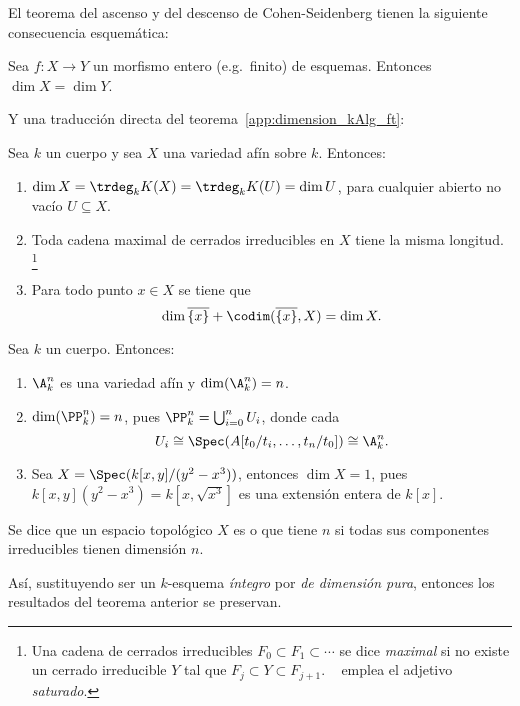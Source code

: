 El teorema del ascenso y del descenso de Cohen-Seidenberg tienen la siguiente consecuencia esquemática:
\begin{cor}
	Sea $f \colon X \to Y$ un morfismo entero (e.g.\ finito) de esquemas.
	Entonces $\dim X = \dim Y$.
\end{cor}

Y una traducción directa del teorema~\ref{app:dimension_kAlg_ft}:
\begin{thm}\label{thm:integral_affine_are_biequidim}
	Sea $k$ un cuerpo y sea $X$ una variedad afín sobre $k$. Entonces:
	\begin{enumerate}
		\item $\dim X = \trdeg_k K(X) = \trdeg_k K(U) = \dim U$, para cualquier abierto no vacío $U \subseteq X$.
		\item Toda cadena maximal de cerrados irreducibles en $X$ tiene la misma longitud.%
			\footnote{Una cadena de cerrados irreducibles $F_0 \subset F_1 \subset \cdots$ se dice \textit{maximal} si no existe un cerrado irreducible
				$Y$ tal que $F_j \subset Y \subset F_{j+1}$. \citeauthor{ega-iv1}~\cite{ega-iv1} emplea el adjetivo \textit{saturado}.}
		\item Para todo punto $x \in X$ se tiene que
			$$ \dim\overline{\{ x \}} + \codim(\overline{\{ x \}}, X) = \dim X. $$
	\end{enumerate}
\end{thm}

\begin{ex}
	Sea $k$ un cuerpo. Entonces:
	\begin{enumerate}
		\item $\A^n_k$ es una variedad afín y $\dim(\A^n_k) = n$.
		\item $\dim(\PP^n_k) = n$, pues $\PP^n_k = \bigcup_{i=0}^{n} U_i$, donde cada
			\[
				U_i \cong \Spec(A[t_0/t_i, \dots, t_n/t_0]) \cong \A^n_k.
			\]
		\item Sea $X = \Spec( k[x, y]/(y^2 - x^3) )$, entonces $\dim X = 1$,
			pues $k[x, y](y^2 - x^3) = k[x, \sqrt{x^3}]$ es una extensión entera de $k[x]$.
	\end{enumerate}
\end{ex}

\begin{mydef}
	Se dice que un espacio topológico $X$ es  o que tiene
	 $n$ si todas sus componentes irreducibles tienen dimensión $n$.
\end{mydef}
Así, sustituyendo ser un $k$-esquema \textit{íntegro} por \textit{de dimensión pura}, entonces los resultados del teorema anterior se preservan.

